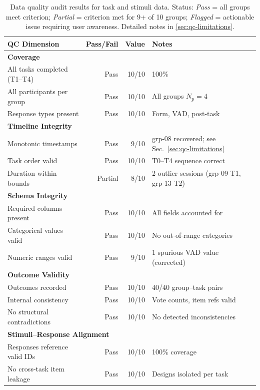 \documentclass[11pt,a4paper]{article}
\begin{document}
\begin{table}[htb]
  \centering
  \caption{Data quality audit results for task and stimuli data.
    Status: \textit{Pass} = all groups meet criterion; \textit{Partial} = criterion
    met for 9+ of 10 groups; \textit{Flagged} = actionable issue requiring
    user awareness. Detailed notes in \cref{sec:qc-limitations}.}
  \label{tab:qc-summary}
  \small
  \begin{tabular}{lrrl}
    \toprule
    QC Dimension & Pass/Fail & Value & Notes \\
    \midrule
    \multicolumn{4}{l}{\textbf{Coverage}} \\
    All tasks completed (T1–T4) & Pass & 10/10 & 100\% \\
    All participants per group & Pass & 10/10 & All groups $N_p = 4$ \\
    Response types present & Pass & 10/10 & Form, VAD, post-task \\[3pt]
    \multicolumn{4}{l}{\textbf{Timeline Integrity}} \\
    Monotonic timestamps & Pass & 9/10 & grp-08 recovered; see Sec.~\ref{sec:qc-limitations} \\
    Task order valid & Pass & 10/10 & T0–T4 sequence correct \\
    Duration within bounds & Partial & 8/10 & 2 outlier sessions (grp-09 T1, grp-13 T2) \\[3pt]
    \multicolumn{4}{l}{\textbf{Schema Integrity}} \\
    Required columns present & Pass & 10/10 & All fields accounted for \\
    Categorical values valid & Pass & 10/10 & No out-of-range categories \\
    Numeric ranges valid & Pass & 9/10 & 1 spurious VAD value (corrected) \\[3pt]
    \multicolumn{4}{l}{\textbf{Outcome Validity}} \\
    Outcomes recorded & Pass & 10/10 & 40/40 group–task pairs \\
    Internal consistency & Pass & 10/10 & Vote counts, item refs valid \\
    No structural contradictions & Pass & 10/10 & No detected inconsistencies \\[3pt]
    \multicolumn{4}{l}{\textbf{Stimuli--Response Alignment}} \\
    Responses reference valid IDs & Pass & 10/10 & 100\% coverage \\
    No cross-task item leakage & Pass & 10/10 & Designs isolated per task \\[3pt]

\end{tabular}
\end{table}
\end{document}
